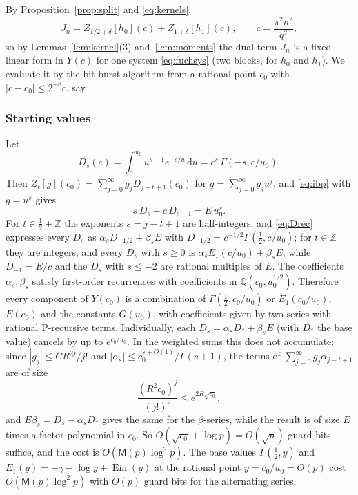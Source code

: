 \documentclass[11pt,reqno]{amsart}
\theoremstyle{definition}
\theoremstyle{remark}
\newcommand{\Ein}{\operatorname{Ein}}
\newcommand{\dd}{\,\mathrm{d}}
\newcommand{\QQ}{\mathbb{Q}}
\newcommand{\ZZ}{\mathbb{Z}}
\newcommand{\Mul}{\mathsf{M}}
\begin{document}
By Proposition~\ref{prop:split} and \eqref{eq:kernels},
\[
  J_n = Z_{1/2+\delta}[h_0](c) + Z_{1+\delta}[h_1](c), \qquad c = \frac{\pi^2n^2}{q^2},
\]
so by Lemmas~\ref{lem:kernel}(3) and~\ref{lem:moments} the dual term $J_n$ is a
fixed linear form in $Y(c)$ for one system \eqref{eq:fuchsys} (two blocks, for $h_0$ and $h_1$). We evaluate
it by the bit-burst algorithm from a rational point $c_0$ with $|c - c_0| \le 2^{-8}c$, say.

\subsubsection{Starting values} Let
\[
  D_s(c) = \int_0^{u_0}u^{s-1}e^{-c/u}\dd u = c^s\,\Gamma(-s, c/u_0).
\]
Then $Z_t[g](c_0) = \sum_{j=0}^{\infty} g_j D_{j-t+1}(c_0)$ for $g = \sum_{j=0}^{\infty} g_j u^j$, and \eqref{eq:ibp} with $g = u^s$ gives
\begin{equation}\label{eq:Drec}
  s\, D_s + c\, D_{s-1} = E\, u_0^s .
\end{equation}
For $t \in \frac12 + \ZZ$ the exponents $s = j - t + 1$ are half-integers, and \eqref{eq:Drec} expresses every
$D_s$ as $\alpha_s D_{-1/2} + \beta_s E$ with $D_{-1/2} = c^{-1/2}\Gamma(\frac12, c/u_0)$; for $t \in \ZZ$ they are integers,
and every $D_s$ with $s \ge 0$ is $\alpha_sE_1(c/u_0) + \beta_sE$, while $D_{-1} = E/c$ and the $D_s$ with $s \le -2$
are rational multiples of $E$. The coefficients
$\alpha_s, \beta_s$ satisfy first-order recurrences with coefficients in $\QQ(c_0, u_0^{1/2})$. Therefore every
component of $Y(c_0)$ is a combination of $\Gamma(\frac12, c_0/u_0)$ or $E_1(c_0/u_0)$, $E(c_0)$ and the constants
$G(u_0)$, with coefficients given by two series with rational P-recursive terms. Individually, each
$D_s = \alpha_sD_* + \beta_sE$ (with $D_*$ the base value) cancels by up to $e^{c_0/u_0}$. In the weighted sums this
does not accumulate: since $|g_j| \le CR^{2j}/j!$ and $|\alpha_s| \le c_0^{s+O(1)}/\Gamma(s+1)$, the terms of
$\sum_{j=0}^{\infty} g_j\alpha_{j-t+1}$ are of size
\[
  \frac{(R^2c_0)^j}{(j!)^2} \le e^{2R\sqrt{c_0}},
\]
and $E\beta_s = D_s - \alpha_s D_*$ gives the same for the $\beta$-series, while the result is of size $E$ times a factor
polynomial in $c_0$. So $O(\sqrt{c_0} + \log p) = O(\sqrt p)$ guard bits suffice, and the cost is $O(\Mul(p)\log^2p)$.
The base values $\Gamma(\frac12, y)$ and $E_1(y) = -\gamma - \log y + \Ein(y)$ at the rational point $y = c_0/u_0 = O(p)$
cost $O(\Mul(p)\log^2 p)$ with $O(p)$ guard bits for the alternating series.
\end{document}

